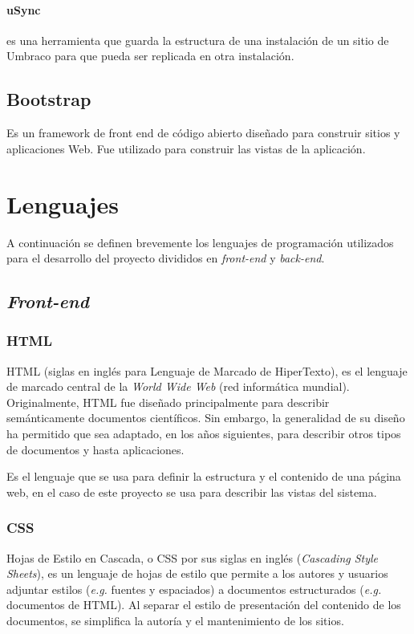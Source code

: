     \paragraph{uSync} es una herramienta que guarda la estructura de una instalación de un sitio de Umbraco para que pueda ser replicada en otra instalación.

    \subsection{Bootstrap}
    Es un framework de front end de código abierto diseñado para construir sitios y aplicaciones Web. Fue utilizado para construir las vistas de la aplicación.

\section{Lenguajes}
A continuación se definen brevemente los lenguajes de programación utilizados para el desarrollo del proyecto divididos en \textit{front-end} y \textit{back-end}.

\subsection{\emph{Front-end}}
\subsubsection{HTML}
HTML (siglas en inglés para Lenguaje de Marcado de HiperTexto), es el lenguaje de marcado central de la \textit{World Wide Web} (red informática mundial). Originalmente, HTML fue diseñado principalmente para describir semánticamente documentos científicos. Sin embargo, la generalidad de su diseño ha permitido que sea adaptado, en los años siguientes, para describir otros tipos de documentos y hasta aplicaciones. \cite{htmlW3C}

Es el lenguaje que se usa para definir la estructura y el contenido de una página web, en el caso de este proyecto se usa para describir las vistas del sistema.

\subsubsection{CSS}
Hojas de Estilo en Cascada, o CSS por sus siglas en inglés (\textit{Cascading Style Sheets}), es un lenguaje de hojas de estilo que permite a los autores y usuarios adjuntar estilos (\textit{e.g.} fuentes y espaciados) a documentos estructurados (\textit{e.g.} documentos de HTML). Al separar el estilo de presentación del contenido de los documentos, se simplifica la autoría y el mantenimiento de los sitios. \cite{cssW3C}


